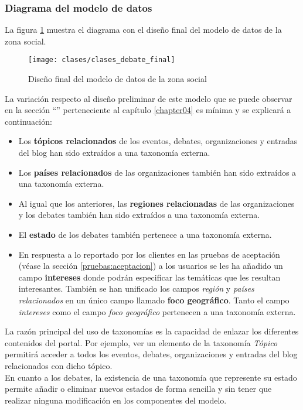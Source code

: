 \subsubsection{Diagrama del modelo de datos}
La figura \ref{fig:diagrama_modelo_social_final} muestra el diagrama con el diseño final del modelo de datos de la zona social.
\begin{landscape}
	\begin{figure}[h]
		\centering
		\texttt{[image: clases/clases\_debate\_final]}
		\caption{Diseño final del modelo de datos de la zona social}
		\label{fig:diagrama_modelo_social_final}
	\end{figure}
\end{landscape}

La variación respecto al diseño preliminar de este modelo que se puede observar en la sección ``'' perteneciente al capítulo \ref{chapter04} es mínima y se explicará a continuación:
\begin{itemize}
	\item Los \textbf{tópicos relacionados} de los eventos, debates, organizaciones y entradas del blog han sido extraídos a una taxonomía externa.
	\item Los \textbf{países relacionados} de las organizaciones también han sido extraídos a una taxonomía externa.
	\item Al igual que los anteriores, las \textbf{regiones relacionadas} de las organizaciones y los debates también han sido extraídos a una taxonomía externa.
	\item El \textbf{estado} de los debates también pertenece a una taxonomía externa.
	\item En respuesta a lo reportado por los clientes en las pruebas de aceptación (véase la sección \ref{pruebas:aceptacion}) a los usuarios se les ha añadido un campo \textbf{intereses} donde podrán especificar las temáticas que les resultan interesantes.  También se han unificado los campos \textit{región} y \textit{países relacionados} en un único campo llamado \textbf{foco geográfico}.  Tanto el campo \textit{intereses} como el campo \textit{foco geográfico} pertenecen a una taxonomía externa.
\end{itemize}

La razón principal del uso de taxonomías es la capacidad de enlazar los diferentes contenidos del portal.  Por ejemplo, ver un elemento de la taxonomía \textit{Tópico} permitirá acceder a todos los eventos, debates, organizaciones y entradas del blog relacionados con dicho tópico.\\
En cuanto a los debates, la existencia de una taxonomía que represente su estado permite añadir o eliminar nuevos estados de forma sencilla y sin tener que realizar ninguna modificación en los componentes del modelo.

